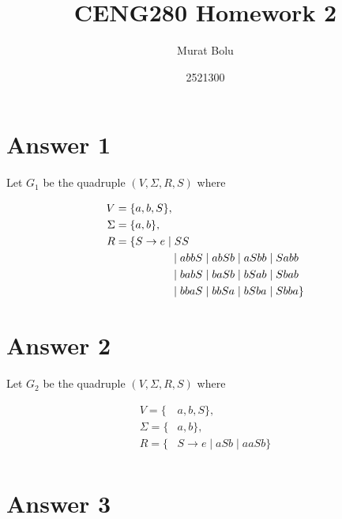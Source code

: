 \documentclass[12pt]{article}
\title{CENG280 Homework 2}
\author{Murat Bolu}
\date{2521300}
\begin{document}
\maketitle

\section*{Answer 1}

\begin{center}
    Let $G_1$ be the quadruple $(V, \Sigma, R, S)$ where
\end{center}
\begin{align*}
    V = \{&a, b, S\}, \\
    \Sigma = \{&a, b\}, \\
    R = \{&S \rightarrow e \mid SS \\
    &\hspace{32 pt} \mid abbS \mid abSb \mid aSbb \mid Sabb \\
    &\hspace{32 pt} \mid babS \mid baSb \mid bSab \mid Sbab \\
    &\hspace{32 pt} \mid bbaS \mid bbSa \mid bSba \mid Sbba\} \\
\end{align*}

\section*{Answer 2}

\begin{center}
    Let $G_2$ be the quadruple $(V, \Sigma, R, S)$ where
\end{center}
\begin{align*}
    V = \{&a, b, S\}, \\
    \Sigma = \{&a, b\}, \\
    R = \{&S \rightarrow e \mid aSb \mid aaSb\} \\
\end{align*}

\newpage

\section*{Answer 3}
\end{document}
